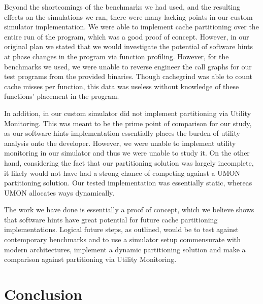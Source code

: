 \documentclass{acm_proc_article-sp}
\begin{document}
Beyond the shortcomings of the benchmarks we had used, and the resulting effects on the simulations we ran, there were many lacking points in our custom simulator implementation. We were able to implement cache partitioning over the entire run of the program, which was a good proof of concept. However, in our original plan we stated that we would investigate the potential of software hints at phase changes in the program via function profiling. However, for the benchmarks we used, we were unable to reverse engineer the call graphs for our test programs from the provided binaries. Though cachegrind was able to count cache misses per function, this data was useless without knowledge of these functions' placement in the program.
 
In addition, in our custom simulator did not implement partitioning via Utility Monitoring. This was meant to be the prime point of comparison for our study, as our software hints implementation essentially places the burden of utility analysis onto the developer.  However, we were unable to implement utility monitoring in our simulator and thus we were unable to study it. On the other hand, considering the fact that our partitioning solution was largely incomplete, it likely would not have had a strong chance of competing against a UMON partitioning solution. Our tested implementation was essentially static, whereas UMON allocates ways dynamically.
 
The work we have done is essentially a proof of concept, which we believe shows that software hints have great potential for future cache partitioning implementations. Logical future steps, as outlined, would be to test against contemporary benchmarks and to use a simulator setup commensurate with modern architectures, implement a dynamic partitioning solution and make a comparison against partitioning via Utility Monitoring.

\section{Conclusion}
\end{document}
